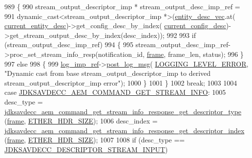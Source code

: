 \begin{DoxyCode}
{{989         \{
990             stream\_output\_descriptor\_imp * stream\_output\_desc\_imp\_ref =
991                 \textcolor{keyword}{dynamic\_cast<}stream\_output\_descriptor\_imp *\textcolor{keyword}{>}(\hyperlink{classavdecc__lib_1_1end__station__imp_a72edab41bc56e3c1757944a7df188a3d}{entity\_desc\_vec}.at(
      \hyperlink{classavdecc__lib_1_1end__station__imp_afd78c89df26ba7641e1adb764c0e827d}{current\_entity\_desc})->get\_config\_desc\_by\_index(
      \hyperlink{classavdecc__lib_1_1end__station__imp_a60b1af40d35e8a86b0082c54ab6cb6a8}{current\_config\_desc})->get\_stream\_output\_desc\_by\_index(desc\_index));
992 
993             \textcolor{keywordflow}{if} (stream\_output\_desc\_imp\_ref)
994             \{
995                 stream\_output\_desc\_imp\_ref->proc\_set\_stream\_info\_resp(notification\_id, 
      \hyperlink{gst__avb__playbin_8c_ac8e710e0b5e994c0545d75d69868c6f0}{frame}, frame\_len, status);
996             \}
997             \textcolor{keywordflow}{else}
998             \{
999                 \hyperlink{namespaceavdecc__lib_acbe3e2a96ae6524943ca532c87a28529}{log\_imp\_ref}->\hyperlink{classavdecc__lib_1_1log_a68139a6297697e4ccebf36ccfd02e44a}{post\_log\_msg}(
      \hyperlink{namespaceavdecc__lib_a501055c431e6872ef46f252ad13f85cdaf2c4481208273451a6f5c7bb9770ec8a}{LOGGING\_LEVEL\_ERROR}, \textcolor{stringliteral}{"Dynamic cast from base stream\_output\_descriptor\_imp to derived
       stream\_output\_descriptor\_imp error"});
1000             \}
1001         \}
1002         \textcolor{keywordflow}{break};
1003 
1004     \textcolor{keywordflow}{case} \hyperlink{group__command_ga24ecb3f0fabecfdd85f217f77279d2ea}{JDKSAVDECC\_AEM\_COMMAND\_GET\_STREAM\_INFO}:
1005         desc\_type = 
      \hyperlink{group__command__get__stream__info__response_ga8a6c2cdf1f47400b5e7802d1a3377f56}{jdksavdecc\_aem\_command\_get\_stream\_info\_response\_get\_descriptor\_type}
      (\hyperlink{gst__avb__playbin_8c_ac8e710e0b5e994c0545d75d69868c6f0}{frame}, \hyperlink{namespaceavdecc__lib_a6c827b1a0d973e18119c5e3da518e65ca9512ad9b34302ba7048d88197e0a2dc0}{ETHER\_HDR\_SIZE});
1006         desc\_index = 
      \hyperlink{group__command__get__stream__info__response_ga58de15f7ac5f1bca0d0a586e6c0a35ba}{jdksavdecc\_aem\_command\_get\_stream\_info\_response\_get\_descriptor\_index}
      (\hyperlink{gst__avb__playbin_8c_ac8e710e0b5e994c0545d75d69868c6f0}{frame}, \hyperlink{namespaceavdecc__lib_a6c827b1a0d973e18119c5e3da518e65ca9512ad9b34302ba7048d88197e0a2dc0}{ETHER\_HDR\_SIZE});
1007 
1008         \textcolor{keywordflow}{if} (desc\_type == \hyperlink{group__descriptor_ga4eb0b7597f11b5fc36f3625acd82e503}{JDKSAVDECC\_DESCRIPTOR\_STREAM\_INPUT})
}}
\end{DoxyCode}
